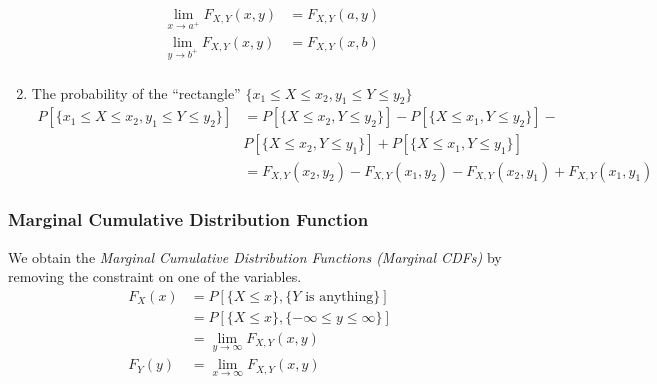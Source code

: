 \begin{enumerate}[label=\textbf{(\roman*)}, noitemsep, nolistsep]
					\begin{equation} \label{eq:Joint CDF Property 4}
						\begin{aligned}
							\lim\limits_{x \rightarrow a^{+}} F_{X,Y} \left( x,y \right) &= F_{X,Y} \left( a,y \right) \\
							\lim\limits_{y \rightarrow b^{+}} F_{X,Y} \left( x,y \right) &= F_{X,Y} \left( x,b \right) \\
						\end{aligned}
					\end{equation}
				\item The probability of the ``rectangle'' $\lbrace x_{1} \leq X \leq x_{2}, y_{1} \leq Y \leq y_{2} \rbrace$
					\begin{equation} \label{eq:Joint CDF Property 5}
						\begin{aligned}
							P \left[ \lbrace x_{1} \leq X \leq x_{2}, y_{1} \leq Y \leq y_{2} \rbrace \right] &= P \left[ \lbrace X \leq x_{2}, Y \leq y_{2} \rbrace \right] - P \left[ \lbrace X \leq x_{1}, Y \leq y_{2} \rbrace \right] - \\
							&P \left[ \lbrace X \leq x_{2}, Y \leq y_{1} \rbrace \right] + P \left[ \lbrace X \leq x_{1}, Y \leq y_{1} \rbrace \right] \\
							&= F_{X,Y} \left( x_{2}, y_{2} \right) - F_{X,Y} \left( x_{1}, y_{2} \right) - F_{X,Y} \left( x_{2}, y_{1} \right) + F_{X,Y} \left( x_{1}, y_{1} \right)
						\end{aligned}
					\end{equation}
			\end{enumerate}
	
		\subsubsection[Marginal CDF]{Marginal Cumulative Distribution Function} \label{subsubsec:Marginal CDF}
			\begin{definition} \label{def:Marginal CDF}
				We obtain the \emph{Marginal Cumulative Distribution Functions (Marginal CDFs)} by removing the constraint on one of the variables. 
				\begin{equation} \label{eq:Marginal CDF}
					\begin{aligned}
						F_{X} \left( x \right) &= P \left[ \lbrace X \leq x \rbrace, \lbrace Y \text{ is anything} \rbrace \right] \\
						&= P \left[ \lbrace X \leq x \rbrace, \lbrace -\infty \leq y \leq \infty \rbrace \right] \\
						&= \lim\limits_{y \rightarrow \infty} F_{X,Y} \left( x,y \right) \\
						F_{Y} \left( y \right) &= \lim\limits_{x \rightarrow \infty} F_{X,Y} \left( x,y \right) \\
					\end{aligned}
				\end{equation}
			\end{definition}
